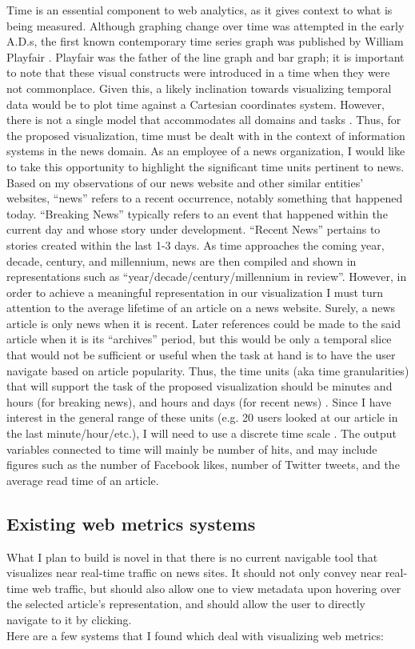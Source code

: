 \documentclass[12pt]{article}
\begin{document}
Time is an essential component to web analytics, as it gives context to what is being measured. Although graphing change over time was attempted in the early A.D.s, the first known contemporary time series graph was published by William Playfair \cite{playfair}. Playfair was the father of the line graph and bar graph; it is important to note that these visual constructs were introduced in a time when they were not commonplace. Given this, a likely inclination towards visualizing temporal data would be to plot time against a Cartesian coordinates system. However, there is not a single model that accommodates all domains and tasks \cite{frank}. Thus, for the proposed visualization, time must be dealt with in the context of information systems in the news domain. As an employee of a news organization, I would like to take this opportunity to highlight the significant time units pertinent to news. Based on my observations of our news website and other similar entities’ websites, “news” refers to a recent occurrence, notably something that happened today. “Breaking News” typically refers to an event that happened within the current day and whose story under development. “Recent News” pertains to stories created within the last 1-3 days. As time approaches the coming year, decade, century, and millennium, news are then compiled and shown in representations such as “year/decade/century/millennium in review”. However, in order to achieve a meaningful representation in our visualization I must turn attention to the average lifetime of an article on a news website. Surely, a news article is only news when it is recent. Later references could be made to the said article when it is its “archives” period, but this would be only a temporal slice that would not be sufficient or useful when the task at hand is to have the user navigate based on article popularity. Thus, the time units (aka time granularities) that will support the task of the proposed visualization should be minutes and hours (for breaking news), and hours and days (for recent news) \cite{bettini}. Since I have interest in the general range of these units (e.g. 20 users looked at our article in the last minute/hour/etc.), I will need to use a discrete time scale \cite{goralwalla}. The output variables connected to time will mainly be number of hits, and may include figures such as the number of Facebook likes, number of Twitter tweets, and the average read time of an article.

\subsection{Existing web metrics systems}
What I plan to build is novel in that there is no current navigable tool that visualizes near real-time traffic on news sites. It should not only convey near real-time web traffic, but should also allow one to view metadata upon hovering over the selected article's representation, and should allow the user to directly navigate to it by clicking.\\
Here are a few systems that I found which deal with visualizing web metrics: \\
\end{document}
